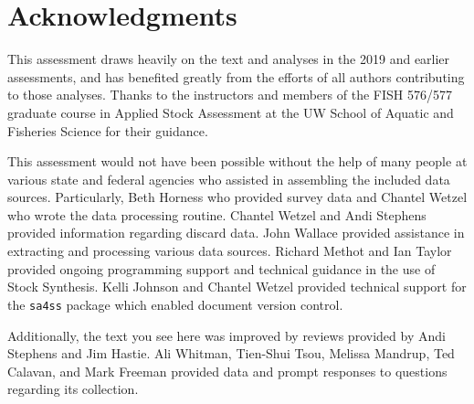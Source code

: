 \documentclass[11pt,
  english,
  a4paper,
]{article}
\begin{document}
\hypertarget{acknowledgments}{%
\section{Acknowledgments}\label{acknowledgments}}

\leavevmode\tagmcend\tagstructend


This assessment draws heavily on the text and analyses in the 2019 and earlier assessments, and has benefited greatly from the efforts of all authors contributing to those analyses. Thanks to the instructors and members of the FISH 576/577 graduate course in Applied Stock Assessment at the UW School of Aquatic and Fisheries Science for their guidance.

\leavevmode\tagmcend\tagstructend\par


This assessment would not have been possible without the help of many people at various state and federal agencies who assisted in assembling the included data sources. Particularly, Beth Horness who provided survey data and Chantel Wetzel who wrote the data processing routine. Chantel Wetzel and Andi Stephens provided information regarding discard data. John Wallace provided assistance in extracting and processing various data sources. Richard Methot and Ian Taylor provided ongoing programming support and technical guidance in the use of Stock Synthesis. Kelli Johnson and Chantel Wetzel provided technical support for the \texttt{sa4ss} package which enabled document version control.

\leavevmode\tagmcend\tagstructend\par

Additionally, the text you see here was improved by reviews provided by Andi Stephens and Jim Hastie. Ali Whitman, Tien-Shui Tsou, Melissa Mandrup, Ted Calavan, and Mark Freeman provided data and prompt responses to questions regarding its collection.

\clearpage

\end{document}
